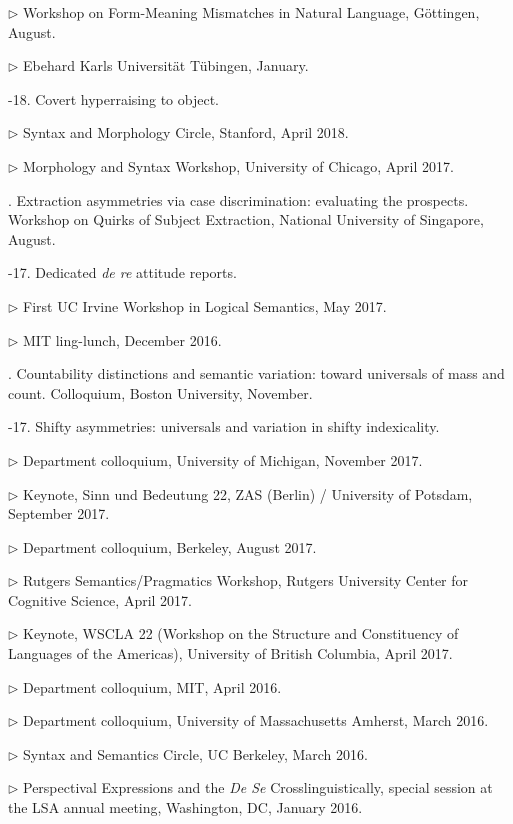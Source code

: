 \documentclass[12pt]{article}
\begin{document}
\indd $\rhd$ Workshop on Form-Meaning Mismatches in Natural Language, G\"ottingen, August.

\indd $\rhd$ Ebehard Karls Universit\"at T\"ubingen, January. 



-18. Covert hyperraising to object.

\indd $\rhd$ 
Syntax and Morphology Circle, Stanford, April 2018.

\indd $\rhd$ 
 Morphology and Syntax Workshop, University of Chicago, April 2017.

. Extraction asymmetries via case discrimination: evaluating the prospects. Workshop on Quirks of Subject Extraction, National University of Singapore, August.


-17. Dedicated \emph{de re} attitude reports. 

\indd $\rhd$ 
First UC Irvine Workshop in Logical Semantics, May 2017.

\indd $\rhd$ MIT ling-lunch, December 2016.


. Countability distinctions and semantic variation: toward universals of mass and count. Colloquium, Boston University, November. 


-17. Shifty asymmetries: universals and variation in shifty indexicality. \nopagebreak


\indd $\rhd$  Department colloquium, University of Michigan, November 2017. 

\indd $\rhd$  Keynote, Sinn und Bedeutung 22, ZAS (Berlin) / University of Potsdam, September 2017. 

\indd $\rhd$ 
Department colloquium, Berkeley, August 2017.

\indd $\rhd$ 
Rutgers Semantics/Pragmatics Workshop, Rutgers University Center for Cognitive Science, April 2017.

\indd $\rhd$ Keynote, WSCLA 22 (Workshop on the Structure and Constituency of Languages of the Americas), University of British Columbia, April 2017. 
\rm 

\indd $\rhd$
 Department colloquium, MIT, April 2016. 

\indd $\rhd$
 Department colloquium, University of Massachusetts Amherst, March 2016.

\indd $\rhd$
Syntax and Semantics Circle, UC Berkeley, March 2016.

\indd $\rhd$
Perspectival Expressions and the \emph{De Se} Crosslinguistically, special session at the LSA annual meeting, Washington, DC, January 2016.
\end{document}
